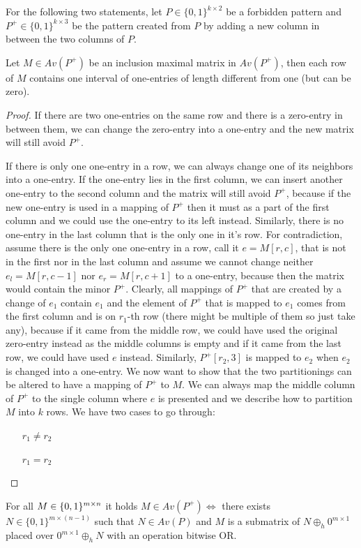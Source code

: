 For the following two statements, let $P\in\{0,1\}^{k\times2}$ be a forbidden pattern and $P^+\in\{0,1\}^{k\times3}$ be the pattern created from $P$ by adding a new column in between the two columns of $P$.
\begin{lemma}
\label{lemmamax}
Let $M\in Av(P^+)$ be an inclusion maximal matrix in $Av(P^+)$, then each row of $M$ contains one interval of one-entries of length different from one (but can be zero).
\end{lemma}
\begin{proof}
If there are two one-entries on the same row and there is a zero-entry in between them, we can change the zero-entry into a one-entry and the new matrix will still avoid $P^+$.

If there is only one one-entry in a row, we can always change one of its neighbors into a one-entry. If the one-entry lies in the first column, we can insert another one-entry to the second column and the matrix will still avoid $P^+$, because if the new one-entry is used in a mapping of $P^+$ then it must as a part of the first column and we could use the one-entry to its left instead. Similarly, there is no one-entry in the last column that is the only one in it's row. For contradiction, assume there is the only one one-entry in a row, call it $e=M[r,c]$, that is not in the first nor in the last column and assume we cannot change neither $e_l=M[r,c-1]$ nor $e_r=M[r,c+1]$ to a one-entry, because then the matrix would contain the minor $P^+$. Clearly, all mappings of $P^+$ that are created by a change of $e_1$ contain $e_1$ and the element of $P^+$ that is mapped to $e_1$ comes from the first column and is on $r_1$-th row (there might be multiple of them so just take any), because if it came from the middle row, we could have used the original zero-entry instead as the middle columns is empty and if it came from the last row, we could have used $e$ instead. Similarly, $P^+[r_2,3]$ is mapped to $e_2$ when $e_2$ is changed into a one-entry. We now want to show that the two partitionings can be altered to have a mapping of $P^+$ to $M$. We can always map the middle column of $P^+$ to the single column where $e$ is presented and we describe how to partition $M$ into $k$ rows. We have two cases to go through:
\begin{itemize}
\item[$r_1\neq r_2$] 
\item[$r_1=r_2$]
\end{itemize}
\end{proof}
\begin{thm}
For all $M\in\{0,1\}^{m\times n}$ it holds $M\in Av(P^+)\Leftrightarrow$ there exists $N\in\{0,1\}^{m\times(n-1)}$ such that $N\in Av(P)$ and $M$ is a submatrix of $N\oplus_h0^{m\times1}$ placed over $0^{m\times1}\oplus_hN$ with an operation bitwise OR.
\end{thm}
